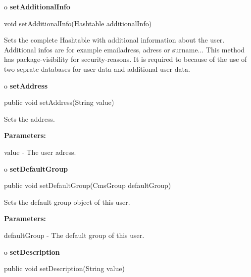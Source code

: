 o {\bf setAdditionalInfo} 

\begin{PRE}
 void setAdditionalInfo(Hashtable additionalInfo)
\end{PRE}

\begin{description}
\htmlDD Sets the complete Hashtable with additional information about the
user. Additional infos are for example emailadress, adress or surname... This
method has package-visibility for security-reasons. It is required to because
of the use of two seprate databases for user data and additional user data. 

\end{description}

o {\bf setAddress} 

\begin{PRE}
 public void setAddress(String value)
\end{PRE}

\begin{description}
\htmlDD Sets the address. 

\begin{description}
\item {\bf Parameters:}  

value - The user adress.  
\end{description}

\end{description}

o {\bf setDefaultGroup} 

\begin{PRE}
 public void setDefaultGroup(CmsGroup defaultGroup)
\end{PRE}

\begin{description}
\htmlDD Sets the default group object of this user. 

\begin{description}
\item {\bf Parameters:}  

defaultGroup - The default group of this user.  
\end{description}

\end{description}

o {\bf setDescription} 

\begin{PRE}
 public void setDescription(String value)
\end{PRE}

